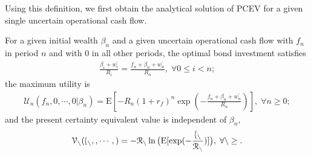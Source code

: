 \documentclass[mnsc,nonblindrev,copyedit]{informs2_wz} %
\newcommand{\E}{\mathrm{E}}
\newcommand{\V}{\cal{V}}
\begin{document}
Using this definition, we first obtain the analytical solution of PCEV for a given single uncertain operational cash flow.

\begin{lemma} \label{lem:pcev-Xn-gen}
For a given initial wealth $\beta_n$ and a given uncertain operational cash flow with $f_n$ in period $n$ and with $0$ in all other periods, the optimal bond investment satisfies
\begin{eqnarray}\label{eqn:beta-Xn}
\frac{\beta_i + w_i^\prime}{R_i} = \frac{f_n+\beta_n + w_n^\prime}{R_n}, \; \forall 0\leq i< n;
\end{eqnarray}
the maximum utility is
\begin{eqnarray} \label{eqn:Un-Xn}
\mathcal{U}_n(f_n, 0, \cdots, 0|\beta_{n}) = \E[-R_n (1+r_f)^n \exp (-  \frac{f_n + \beta_n +w_n^\prime}{R_n})], \; \forall n \geq 0;
\end{eqnarray}
and the present certainty equivalent value is independent of $\beta_n$,
\begin{eqnarray}
\V_n(f_n,0,\cdots,0)=-R_n \ln\big{(} \E[\exp(-\frac{f_n}{R_n})]\big{)}, \; \forall n \geq 0. \label{eqn:pcev-Xn-gen}
\end{eqnarray}
\end{lemma}
\end{document}
